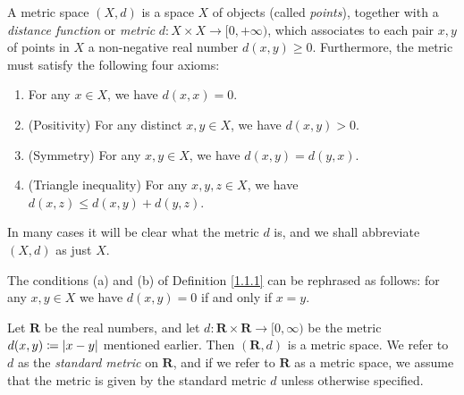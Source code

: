 \begin{definition}\label{1.1.2}
    A metric space \((X, d)\) is a space \(X\) of objects (called \emph{points}), together with a \emph{distance function} or \emph{metric} \(d : X \times X \to [0, +\infty)\), which associates to each pair \(x, y\) of points in \(X\) a non-negative real number \(d(x, y) \geq 0\).
    Furthermore, the metric must satisfy the following four axioms:
    \begin{enumerate}
        \item For any \(x \in X\), we have \(d(x, x) = 0\).
        \item (Positivity) For any distinct \(x, y \in X\), we have \(d(x, y) > 0\).
        \item (Symmetry) For any \(x, y \in X\), we have \(d(x, y) = d(y, x)\).
        \item (Triangle inequality) For any \(x, y, z \in X\), we have \(d(x, z) \leq d(x, y) + d(y, z)\).
    \end{enumerate}
\end{definition}

\begin{note}
    In many cases it will be clear what the metric \(d\) is, and we shall abbreviate \((X, d)\) as just \(X\).
\end{note}

\begin{remark}\label{1.1.3}
    The conditions (a) and (b) of Definition \ref{1.1.1} can be rephrased as follows:
    for any \(x, y \in X\) we have \(d(x, y) = 0\) if and only if \(x = y\).
\end{remark}

\begin{example}\label{1.1.4}
    Let \(\mathbf{R}\) be the real numbers, and let \(d : \mathbf{R} \times \mathbf{R} \to [0, \infty)\) be the metric \(d(x, y) \coloneqq \abs*{x - y}\) mentioned earlier.
    Then \((\mathbf{R}, d)\) is a metric space.
    We refer to \(d\) as the \emph{standard metric} on \(\mathbf{R}\), and if we refer to \(\mathbf{R}\) as a metric space, we assume that the metric is given by the standard metric \(d\) unless otherwise specified.
\end{example}